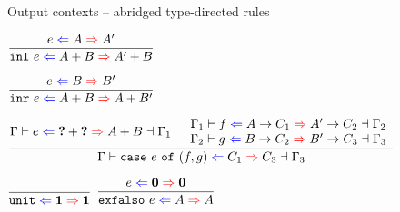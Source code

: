 \documentclass{beamer}
\newcommand{\Fun}[2]{#1 \to #2}
\newcommand{\Sum}[2]{#1 + #2}
\newcommand{\Unit}{\textbf{1}}
\newcommand{\Empty}{\textbf{0}}
\newcommand{\inl}[1]{\texttt{inl}\ #1}
\newcommand{\inr}[1]{\texttt{inr}\ #1}
\newcommand{\case}[3]{\texttt{case}\ #1\ \texttt{of}\ (#2, #3)}
\newcommand{\unit}{\texttt{unit}}
\newcommand{\exfalso}[1]{\texttt{exfalso}\ #1}
\newcommand{\rulename}[1]{\textsc{\footnotesize{#1}}}
\newcommand{\infrule}[3][]{\displaystyle \frac{#2}{#3} \rulename{#1}}
\begin{document}
\begin{frame}{Output contexts -- abridged type-directed rules}

\begin{center}
  $\infrule{\shortoutctx{e}{A}{A'}}{\shortoutctx{\inl{e}}{\Sum{A}{B}}{\Sum{A'}{B}}}$

  \vspace{2em}

  $\infrule{\shortoutctx{e}{B}{B'}}{\shortoutctx{\inr{e}}{\Sum{A}{B}}{\Sum{A}{B'}}}$

  \vspace{2em}

  $\infrule{\fulloutctx{\Gamma}{e}{\Sum{\Hole}{\Hole}}{\Sum{A}{B}}{\Gamma_1} \quad \begin{array}{c} \fulloutctx{\Gamma_1}{f}{\Fun{A}{C_1}}{\Fun{A'}{C_2}}{\Gamma_2} \\ \fulloutctx{\Gamma_2}{g}{\Fun{B}{C_2}}{\Fun{B'}{C_3}}{\Gamma_3} \end{array}}{\fulloutctx{\Gamma}{\case{e}{f}{g}}{C_1}{C_3}{\Gamma_3}}$

  \vspace{2em}

  $\infrule{}{\shortoutctx{\unit}{\Unit}{\Unit}}$
  \quad
  $\infrule{\shortoutctx{e}{\Empty}{\Empty}}{\shortoutctx{\exfalso{e}}{A}{A}}$
\end{center}

\end{frame}
\end{document}

